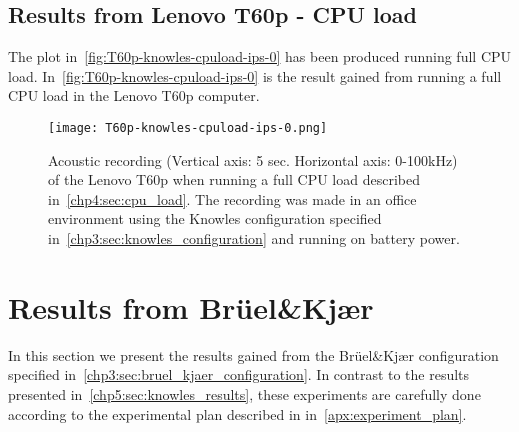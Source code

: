 \subsection{Results from Lenovo T60p - CPU load}\label{chp5:subsec:t60p_knowles_results_cpuload}
The plot in~\autoref{fig:T60p-knowles-cpuload-ips-0} has been produced running full CPU load.
In~\autoref{fig:T60p-knowles-cpuload-ips-0} is the result gained from running a full CPU load in the Lenovo T60p computer. 
\begin{figure}[ht]
    \centering
    \texttt{[image: T60p-knowles-cpuload-ips-0.png]}
    \caption{Acoustic recording (Vertical axis: 5 sec. Horizontal axis: 0-100kHz) of the Lenovo T60p when running a full CPU load described in~\autoref{chp4:sec:cpu_load}. The recording was made in an office environment using the Knowles configuration specified in~\autoref{chp3:sec:knowles_configuration} and running on battery power. }
    \label{fig:T60p-knowles-cpuload-ips-0}
\end{figure}

\section{Results from Brüel\&Kjær}\label{chp5:sec:bk_results}
In this section we present the results gained from the Brüel\&Kjær configuration specified in~\autoref{chp3:sec:bruel_kjaer_configuration}. 
In contrast to the results presented in~\autoref{chp5:sec:knowles_results}, these experiments are carefully done according to the experimental plan described in in~\autoref{apx:experiment_plan}. 

